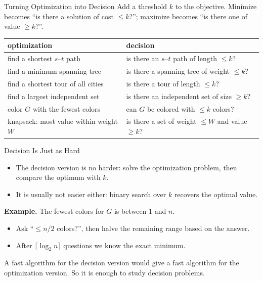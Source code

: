\documentclass[10pt,aspectratio=169]{beamer}
\begin{document}
\begin{frame}{Turning Optimization into Decision}
  Add a threshold $k$ to the objective. \alert{Minimize} becomes ``is there a
  solution of cost $\le k$?''; \alert{maximize} becomes ``is there one of
  value $\ge k$?''.

  \medskip
  \begin{center}
  \small
  \begin{tabular}{ll}
    \toprule
    optimization & decision \\
    \midrule
    find a shortest $s$--$t$ path & is there an $s$--$t$ path of length
      $\le k$? \\
    find a minimum spanning tree & is there a spanning tree of weight
      $\le k$? \\
    find a shortest tour of all cities & is there a tour of length
      $\le k$? \\
    find a largest independent set & is there an independent set of size
      $\ge k$? \\
    color $G$ with the fewest colors & can $G$ be colored with $\le k$
      colors? \\
    knapsack: most value within weight $W$ & is there a set of weight
      $\le W$ and value $\ge k$? \\
    \bottomrule
  \end{tabular}
  \end{center}
\end{frame}

\begin{frame}{Decision Is Just as Hard}
  \begin{itemize}
    \item The decision version is \alert{no harder}: solve the optimization
          problem, then compare the optimum with $k$.
    \item It is usually \alert{not easier} either: binary search over $k$
          recovers the optimal value.
  \end{itemize}

  \pause
  \bigskip
  \textbf{Example.} The fewest colors for $G$ is between $1$ and $n$.
  \begin{itemize}
    \item Ask ``$\le n/2$ colors?'', then halve the remaining range based on
          the answer.
    \item After $\lceil \log_2 n \rceil$ questions we know the exact minimum.
  \end{itemize}

  \medskip
  A fast algorithm for the decision version would give a fast algorithm for
  the optimization version. So it is enough to study \alert{decision}
  problems.
\end{frame}
\end{document}

